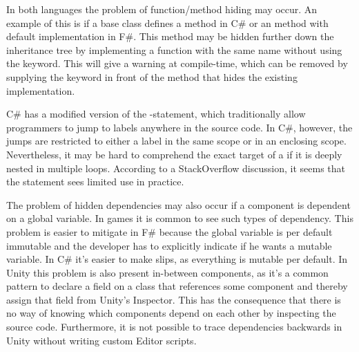 In both languages the problem of function/method hiding may occur. An example of this is if a base class defines a  method in C\# or an  method with default implementation in F\#. This method may be hidden further down the inheritance tree by implementing a function with the same name without using the  keyword. This will give a warning at compile-time, which can be removed by supplying the  keyword in front of the method that hides the existing implementation.

C\# has a modified version of the -statement, which traditionally allow programmers to jump to labels anywhere in the source code. In C\#, however, the jumps are restricted to either a label in the same scope or in an enclosing scope\cite{csharp:goto}. Nevertheless, it may be hard to comprehend the exact target of a  if it is deeply nested in multiple loops. According to a StackOverflow discussion\cite{goto:stack:overflow}, it seems that the  statement sees limited use in practice.

The problem of hidden dependencies may also occur if a component is dependent on a global variable. In games it is common to see such types of dependency\cite{blow2004game, guana2015building, nystrom2014game}. This problem is easier to mitigate in F\# because the global variable is per default immutable and the developer has to explicitly indicate if he wants a mutable variable. In C\# it's easier to make slips, as everything is mutable per default. In Unity this problem is also present in-between components, as it's a common pattern to declare a field on a class that references some component and thereby assign that field from Unity's Inspector\cite{unity:inspector:assignment}. This has the consequence that there is no way of knowing which components depend on each other by inspecting the source code. Furthermore, it is not possible to trace dependencies backwards in Unity without writing custom Editor scripts\cite{unity:dependencies:backwards}.